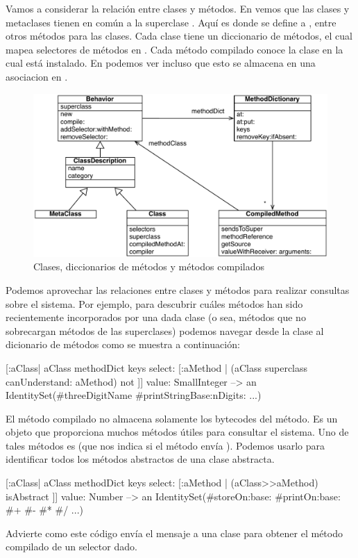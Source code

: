 \documentclass[a4paper,10pt,twoside]{book}
\begin{document}
Vamos a considerar la relaci\'on entre clases y m\'etodos.  En
 vemos que las clases y metaclases tienen en
com\'un a la superclase .  Aqu\'i es donde se define a
, entre otros m\'etodos para las clases.  Cada
clase tiene un diccionario de m\'etodos, el cual mapea selectores de
m\'etodos en .  Cada m\'etodo compilado conoce la
clase en la cual est\'a instalado.  En  podemos
ver incluso que esto se almacena en una asociacion en .

\begin{figure}[ht]\centering
        \includegraphics[width=\linewidth]{MethodsAsObjects}
        \caption{Clases, diccionarios de m\'etodos y m\'etodos compilados}
\end{figure}

Podemos aprovechar las relaciones entre clases y m\'etodos para realizar
consultas sobre el sistema.  Por ejemplo, para descubrir cu\'ales
m\'etodos han sido recientemente incorporados por una dada clase (o sea,
m\'etodos que no sobrecargan m\'etodos de las superclases) podemos navegar
desde la clase al dicionario de m\'etodos como se muestra a
continuaci\'on:
\begin{code}{}
[:aClass| aClass methodDict keys select: [:aMethod |
  (aClass superclass canUnderstand: aMethod) not ]] value: SmallInteger
  --> an IdentitySet(#threeDigitName #printStringBase:nDigits: ...)
\end{code}

El m\'etodo compilado no almacena solamente los bytecodes del m\'etodo.
Es un objeto que proporciona muchos m\'etodos \'utiles para consultar el
sistema.  Uno de tales m\'etodos es  (que nos indica si
el m\'etodo env\'ia ).  Podemos usarlo para
identificar todos los m\'etodos abstractos de una clase abstracta.
\begin{code}{}
[:aClass| aClass methodDict keys select: [:aMethod |
  (aClass>>aMethod) isAbstract ]] value: Number
  --> an IdentitySet(#storeOn:base: #printOn:base: #+ #- #* #/ ...)
\end{code}
Advierte como este c\'odigo env\'ia el mensaje \ct{>>} a una clase para
obtener el m\'etodo compilado de un selector dado.
\end{document}
